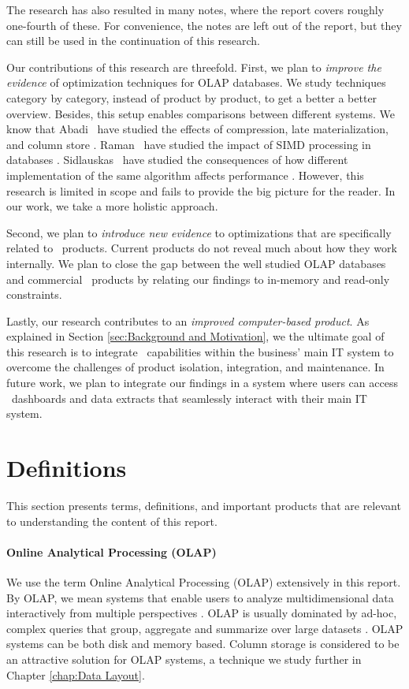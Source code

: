 The research has also resulted in many notes, where the report covers roughly one-fourth of these. For convenience, the notes are left out of the report, but they can still be used in the continuation of this research.

Our contributions of this research are threefold. First, we plan to \textit{improve the evidence} of optimization techniques for OLAP databases. We study techniques category by category, instead of product by product, to get a better a better overview. Besides, this setup enables comparisons between different systems. We know that Abadi \ea~have studied the effects of compression, late materialization, and column store \cite{Abadi2008-dd}. Raman \ea~have studied the impact of SIMD processing in databases \cite{Raman2008-gi}. Sidlauskas \ea~have studied the consequences of how different implementation of the same algorithm affects performance \cite{Sidlauskas2014-ef}. However, this research is limited in scope and fails to provide the big picture for the reader. In our work, we take a more holistic approach.

Second, we plan to \textit{introduce new evidence} to optimizations that are specifically related to \bd~products. Current products do not reveal much about how they work internally. We plan to close the gap between the well studied OLAP databases and commercial \bd~products by relating our findings to in-memory and read-only constraints.

Lastly, our research contributes to an \textit{improved computer-based product}. As explained in Section \ref{sec:Background and Motivation}, we the ultimate goal of this research is to integrate \bd~capabilities within the business' main IT system to overcome the challenges of product isolation, integration, and maintenance. In future work, we plan to integrate our findings in a system where users can access \bd~dashboards and data extracts that seamlessly interact with their main IT system.

\section{Definitions}
\label{sec:Definitions}

This section presents terms, definitions, and important products that are relevant to understanding the content of this report.

\paragraph{Online Analytical Processing (OLAP)}
\label{par:Online Analytical Processing (OLAP)}
  We use the term Online Analytical Processing (OLAP) extensively in this report. By OLAP, we mean systems that enable users to analyze multidimensional data interactively from multiple perspectives \cite{Wikipedia_contributors2015-hw}. OLAP is usually dominated by ad-hoc, complex queries that group, aggregate and summarize over large datasets \cite{Bjorklund2011-wh}. OLAP systems can be both disk and memory based. Column storage is considered to be an attractive solution for OLAP systems, a technique we study further in Chapter \ref{chap:Data Layout}.


